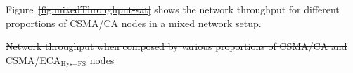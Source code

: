 \documentclass[a4paper,journal]{IEEEtran}
\providecommand{\DIFaddtex}[1]{{\protect\color{blue}\uwave{#1}}} %
\providecommand{\DIFdeltex}[1]{{\protect\color{red}\sout{#1}}}                      %
\providecommand{\DIFaddbegin}{} %
\providecommand{\DIFaddend}{} %
\providecommand{\DIFdelbegin}{} %
\providecommand{\DIFdelend}{} %
\providecommand{\DIFdelFL}[1]{\DIFdel{#1}} %
\providecommand{\DIFadd}[1]{\texorpdfstring{\DIFaddtex{#1}}{#1}} %
\providecommand{\DIFdel}[1]{\texorpdfstring{\DIFdeltex{#1}}{}} %
\begin{document}
	Figure~\DIFdelbegin \DIFdel{\ref{fig:mixedThroughput-sat} }\DIFdelend \DIFaddbegin \DIFadd{\ref{fig:coexResults}a }\DIFaddend shows the network throughput for different proportions of CSMA/CA nodes in a mixed network setup.

\DIFdelbegin %
{%
\DIFdelFL{Network throughput when composed by various proportions of CSMA/CA and CSMA/ECA$_{\text{Hys+FS}}$ nodes}}
\DIFdelend %
\end{document}
